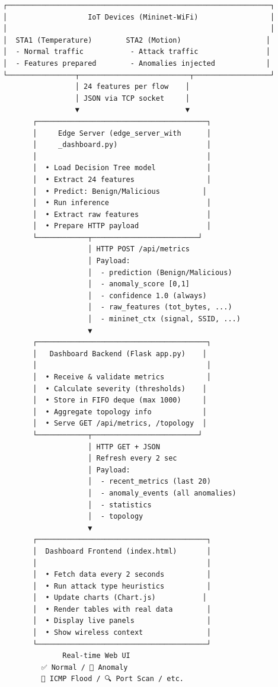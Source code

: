 \documentclass[12pt,a4paper]{article}
\begin{document}
\begin{verbatim}
┌──────────────────────────────────────────────────────────────┐
│                   IoT Devices (Mininet-WiFi)                 │
│                                                              │
│  STA1 (Temperature)        STA2 (Motion)                    │
│  - Normal traffic           - Attack traffic                │
│  - Features prepared        - Anomalies injected            │
└────────────────┬──────────────────────────┬──────────────────┘
                 │ 24 features per flow    │
                 │ JSON via TCP socket     │
                 ▼                         ▼
       ┌────────────────────────────────────────┐
       │     Edge Server (edge_server_with      │
       │     _dashboard.py)                     │
       │                                        │
       │  • Load Decision Tree model            │
       │  • Extract 24 features                 │
       │  • Predict: Benign/Malicious          │
       │  • Run inference                       │
       │  • Extract raw features                │
       │  • Prepare HTTP payload                │
       └────────────┬─────────────────────────┘
                    │ HTTP POST /api/metrics
                    │ Payload:
                    │  - prediction (Benign/Malicious)
                    │  - anomaly_score [0,1]
                    │  - confidence 1.0 (always)
                    │  - raw_features (tot_bytes, ...)
                    │  - mininet_ctx (signal, SSID, ...)
                    ▼
       ┌────────────────────────────────────────┐
       │   Dashboard Backend (Flask app.py)    │
       │                                        │
       │  • Receive & validate metrics          │
       │  • Calculate severity (thresholds)    │
       │  • Store in FIFO deque (max 1000)     │
       │  • Aggregate topology info            │
       │  • Serve GET /api/metrics, /topology  │
       └────────────┬─────────────────────────┘
                    │ HTTP GET + JSON
                    │ Refresh every 2 sec
                    │ Payload:
                    │  - recent_metrics (last 20)
                    │  - anomaly_events (all anomalies)
                    │  - statistics
                    │  - topology
                    ▼
       ┌────────────────────────────────────────┐
       │  Dashboard Frontend (index.html)       │
       │                                        │
       │  • Fetch data every 2 seconds          │
       │  • Run attack type heuristics          │
       │  • Update charts (Chart.js)           │
       │  • Render tables with real data        │
       │  • Display live panels                 │
       │  • Show wireless context               │
       └────────────────────────────────────────┘
              Real-time Web UI
         ✅ Normal / 🔴 Anomaly
         🌊 ICMP Flood / 🔍 Port Scan / etc.
\end{verbatim}
\end{document}
